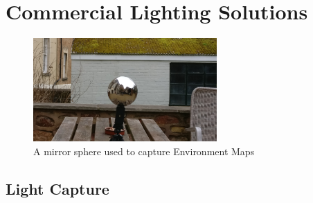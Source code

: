 \documentclass[ %
                    author={Gavin Parker},
                supervisor={Dr. Neill Campbell},
                    degree={MEng},
                     title={Deep Siamese Networks for Illumination Estimation from Stereo Images},
                  subtitle={},
                      type={Research},
                      year={2018} ]{dissertation}
\begin{document}
\section{Commercial Lighting Solutions}
\begin{figure}[H] 
\centering 
\includegraphics[width=7cm]{images/envmap} 
\caption{A mirror sphere used to capture Environment Maps} 
\end{figure} 
\subsection{Light Capture}
\end{document}
